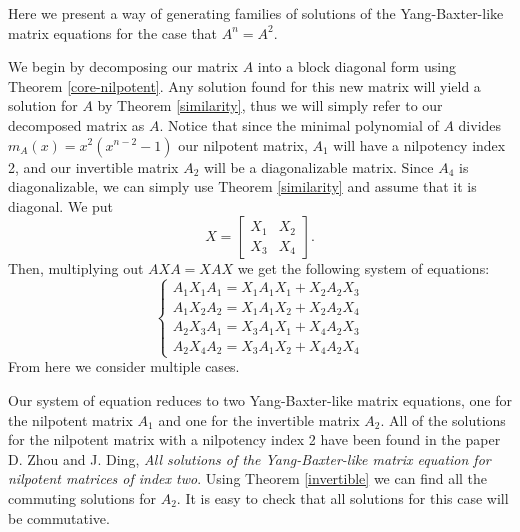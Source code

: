 \documentclass{article}
\begin{document}
\begin{algorithm}
  Here we present a way of generating families of solutions of the Yang-Baxter-like matrix equations for the case that $A^n = A^2$.

  We begin by decomposing our matrix $A$ into a block diagonal form using Theorem \ref{core-nilpotent}.
  Any solution found for this new matrix will yield a solution for $A$ by Theorem \ref{similarity}, thus we will simply refer to our decomposed matrix as $A$.
  Notice that since the minimal polynomial of $A$ divides $m_A(x) = x^2 (x^{n - 2} - 1)$ our nilpotent matrix, $A_1$ will have a nilpotency index 2, and our invertible matrix $A_2$ will be a diagonalizable matrix.
  Since $A_4$ is diagonalizable, we can simply use Theorem \ref{similarity} and assume that it is diagonal.
  We put
  \[X = \begin{bmatrix} X_1 & X_2\\ X_3 & X_4 \end{bmatrix}.\]
  Then, multiplying out $A X A = X A X$ we get the following system of equations:
  \[\begin{cases}
    A_1 X_1 A_1 = X_1 A_1 X_1 + X_2 A_2 X_3\\
    A_1 X_2 A_2 = X_1 A_1 X_2 + X_2 A_2 X_4\\
    A_2 X_3 A_1 = X_3 A_1 X_1 + X_4 A_2 X_3\\
    A_2 X_4 A_2 = X_3 A_1 X_2 + X_4 A_2 X_4
  \end{cases}\]
  From here we consider multiple cases.

  \begin{case}[$X_2 = X_3 = 0$]
    Our system of equation reduces to two Yang-Baxter-like matrix equations, one for the nilpotent matrix $A_1$ and one for the invertible matrix $A_2$.
    All of the solutions for the nilpotent matrix with a nilpotency index 2 have been found in the paper D. Zhou and J. Ding, \textit{All solutions of the Yang-Baxter-like matrix equation for nilpotent matrices of index two}.
    Using Theorem \ref{invertible} we can find all the commuting solutions for $A_2$.
    It is easy to check that all solutions for this case will be commutative.
  \end{case}


\end{algorithm}
\end{document}
